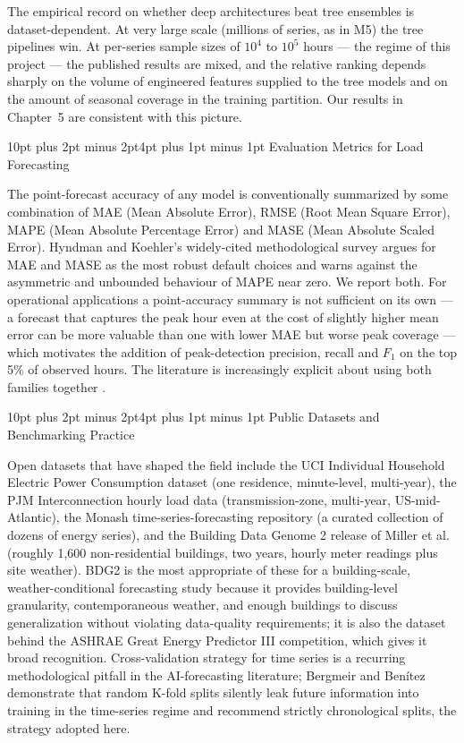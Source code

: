 \documentclass[12pt,a4paper,openany]{report}
\makeatletter
\renewcommand{\section}{\@startsection{section}{1}{\z@}%
  {10pt plus 2pt minus 2pt}{4pt plus 1pt minus 1pt}%
  {\normalfont\normalsize\bfseries}}
\makeatother
\begin{document}
The empirical record on whether deep architectures beat tree ensembles is dataset-dependent. At very large scale (millions of series, as in M5) the tree pipelines win. At per-series sample sizes of $10^4$ to $10^5$ hours --- the regime of this project --- the published results are mixed, and the relative ranking depends sharply on the volume of engineered features supplied to the tree models and on the amount of seasonal coverage in the training partition. Our results in Chapter~5 are consistent with this picture.

\section{Evaluation Metrics for Load Forecasting}

The point-forecast accuracy of any model is conventionally summarized by some combination of MAE (Mean Absolute Error), RMSE (Root Mean Square Error), MAPE (Mean Absolute Percentage Error) and MASE (Mean Absolute Scaled Error). Hyndman and Koehler's widely-cited methodological survey \cite{ref_hyndman_mae} argues for MAE and MASE as the most robust default choices and warns against the asymmetric and unbounded behaviour of MAPE near zero. We report both. For operational applications a point-accuracy summary is not sufficient on its own --- a forecast that captures the peak hour even at the cost of slightly higher mean error can be more valuable than one with lower MAE but worse peak coverage --- which motivates the addition of peak-detection precision, recall and $F_1$ on the top 5\% of observed hours. The literature is increasingly explicit about using both families together \cite{ref_makridakis_m4}.

\section{Public Datasets and Benchmarking Practice}

Open datasets that have shaped the field include the UCI Individual Household Electric Power Consumption dataset \cite{ref_uci_household} (one residence, minute-level, multi-year), the PJM Interconnection hourly load data \cite{ref_pjm} (transmission-zone, multi-year, US-mid-Atlantic), the Monash time-series-forecasting repository (a curated collection of dozens of energy series), and the Building Data Genome 2 release \cite{ref_miller_bdg2} of Miller et al. (roughly 1{,}600 non-residential buildings, two years, hourly meter readings plus site weather). BDG2 is the most appropriate of these for a building-scale, weather-conditional forecasting study because it provides building-level granularity, contemporaneous weather, and enough buildings to discuss generalization without violating data-quality requirements; it is also the dataset behind the ASHRAE Great Energy Predictor III competition, which gives it broad recognition. Cross-validation strategy for time series is a recurring methodological pitfall in the AI-forecasting literature; Bergmeir and Ben\'itez \cite{ref_bergmeir_cv} demonstrate that random K-fold splits silently leak future information into training in the time-series regime and recommend strictly chronological splits, the strategy adopted here.
\end{document}
